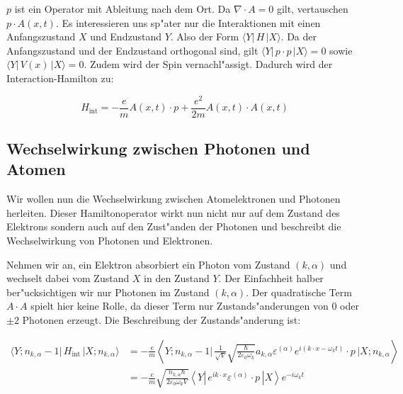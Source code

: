 $p$ ist ein Operator mit Ableitung nach dem Ort. Da $\nabla \cdot A = 0$ gilt, vertauschen $p \cdot A(x, t)$. Es interessieren uns sp"ater nur die Interaktionen mit einen Anfangszustand $X$ und Endzustand $Y$. Also der Form $\langle Y| \, H \, |X \rangle$. Da der Anfangszustand und der Endzustand orthogonal sind, gilt $\langle Y| \, p \cdot p \, |X \rangle = 0$ sowie $\langle Y| \, V(x) \, |X \rangle = 0$. Zudem wird der Spin vernachl"assigt. Dadurch wird der Interaction-Hamilton zu:

\begin{equation*}
H_{\text{int}} = -\frac{e}{m} A(x, t) \cdot p + \frac{e^2}{2m}A(x, t) \cdot A(x, t)
\end{equation*}

\subsection{Wechselwirkung zwischen Photonen und Atomen}

Wir wollen nun die Wechselwirkung zwischen Atomelektronen und Photonen herleiten. Dieser Hamiltonoperator wirkt nun nicht nur auf dem Zustand des Elektrons sondern auch auf den Zust"anden der Photonen und beschreibt die Wechselwirkung von Photonen und Elektronen.

Nehmen wir an, ein Elektron absorbiert ein Photon vom Zustand $(k,\alpha)$ und wechselt dabei vom Zustand $X$ in den Zustand $Y$. Der Einfachheit halber ber"ucksichtigen wir nur Photonen im Zustand $(k,\alpha)$. Der quadratische Term $A \cdot A$ spielt hier keine Rolle, da dieser Term nur Zustands"anderungen von $0$ oder $\pm 2$ Photonen erzeugt. Die Beschreibung der Zustands"anderung ist:

\begin{equation} \label{fq:absorbtion}
\begin{split}
\langle Y; n_{k,\alpha} - 1 |\, H_{\text{int}} \,| X; n_{k,\alpha} \rangle &=
 -\frac{e}{m} \left\langle Y; n_{k,\alpha} - 1 \biggl| 
 \, \frac{1}{\sqrt{V}} \sqrt{\frac{\hbar}{2 \varepsilon_0 \omega_k}}a_{k,\alpha} \varepsilon^{(\alpha)} e^{i(k \cdot x-\omega_k t)} \cdot p \,
\biggl| X; n_{k,\alpha} \right\rangle\\
&= -\frac{e}{m} \sqrt{\frac{n_{k,\alpha} \hbar}{2 \varepsilon_0 \omega_k V}} \left\langle Y \left|
\, e^{ik \cdot x} \varepsilon^{(\alpha)} \cdot p \,
\right| X \right\rangle e^{-i\omega_k t}
\end{split}
\end{equation}

